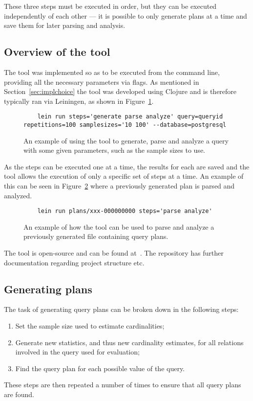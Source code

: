 These three steps must be executed in order, but they can be executed
independently of each other --- it is possible to only generate plans at a time and save them for later parsing and analysis.

\subsection{Overview of the tool}
The tool was implemented so as to be executed from the command line, providing
all the necessary parameters via flags. As mentioned in
Section~\ref{sec:implchoice} the tool was developed using Clojure and is
therefore typically ran via Leiningen, as shown in
Figure~\ref{fig:cmd:runtool1}.

\begin{figure}[ht]
  \begin{verbatim}
    lein run steps='generate parse analyze' query=queryid repetitions=100 samplesizes='10 100' --database=postgresql
  \end{verbatim}
  \caption[Using the tool to generate, parse and analyze a query]{An example of
    using the tool to generate, parse and analyze a query with some given
    parameters, such as the sample sizes to use.}\label{fig:cmd:runtool1}
\end{figure}

As the steps can be executed one at a time, the results for each are saved and
the tool allows the execution of only a specific set of steps at a time. An
example of this can be seen in Figure~\ref{fig:cmd:runtool2} where a previously
generated plan is parsed and analyzed.

\begin{figure}[ht]
  \begin{verbatim}
    lein run plans/xxx-000000000 steps='parse analyze'
  \end{verbatim}
  \caption[Using the tool to parse and analyze a previously generated plan]{An
    example of how the tool can be used to parse and analyze a previously
    generated file containing query plans.}\label{fig:cmd:runtool2}
\end{figure}

The tool is open-source and can be found at~\cite{barksten_mbark_m}. The
repository has further documentation regarding project structure etc.

\subsection{Generating plans}\label{sec:generatingplans}
The task of generating query plans can be broken down in the following steps:
\begin{enumerate}
\item Set the sample size used to estimate cardinalities;
\item Generate new statistics, and thus new cardinality estimates, for all
  relations involved in the query used for evaluation;
\item Find the query plan for each possible value of the query.
\end{enumerate}
These steps are then repeated a number of times to ensure that all query plans
are found.

